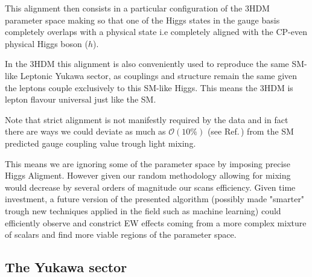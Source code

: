 \documentclass[10pt]{book}
\renewcommand{\(}{\left(}
\renewcommand{\)}{\right)}
\renewcommand{\[}{\left[}
\renewcommand{\]}{\right]}
\begin{document}
This alignment then consists in a particular configuration of the 3HDM parameter space making so that one of the Higgs states in the gauge basis completely overlaps with a physical state i.e completely aligned with the CP-even physical Higgs boson ($h$). 

In the 3HDM this alignment is also conveniently used to reproduce the same SM-like Leptonic Yukawa sector, as couplings and structure remain the same given the leptons couple exclusively to this SM-like Higgs. 
%
This means the 3HDM is lepton flavour universal just like the SM. 

Note that strict alignment is not manifestly required by the data and in fact there are ways we could deviate as much as $\mathcal{O}(10\%)$ (see Ref.\,\cite{Aad_2020}) from the SM predicted gauge coupling value trough light mixing. 

This means we are ignoring some of the parameter space by imposing precise Higgs Aligment.
%
However given our random methodology allowing for mixing would decrease by several orders of magnitude our scans efficiency. 
%
Given time investment, a future version of the presented algorithm (possibly made "smarter" trough new techniques applied in the field such as machine learning) could efficiently observe and constrict EW effects coming from a more complex mixture of scalars and find more viable regions of the parameter space.  

\subsection{The Yukawa sector}
\end{document}
